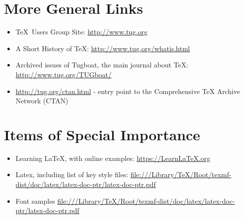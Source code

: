 \documentclass[12pt, oneside]{article}
\begin{document}
\section{More General Links}

\begin{itemize}
	
	\item \TeX\ Users Group Site: \newline \url{http://www.tug.org}

\item	A Short History of \TeX: \newline  \url{http://www.tug.org/whatis.html}

\item	Archived issues of Tugboat, the main journal about \TeX: \newline  \url{http://www.tug.org/TUGboat/}

\item \url{http://tug.org/ctan.html} - entry point to the Comprehensive TeX Archive Network (CTAN)


\end{itemize}


\section{Items of Special Importance}
\begin{itemize}
\item Learning LaTeX, with online examples: \url{https://LearnLaTeX.org}
\item Latex, including list of key style files: \url{file:///Library/TeX/Root/texmf-dist/doc/latex/latex-doc-ptr/latex-doc-ptr.pdf}
\item Font samples \url{file:///Library/TeX/Root/texmf-dist/doc/latex/latex-doc-ptr/latex-doc-ptr.pdf}
\end{itemize}
\end{document}
